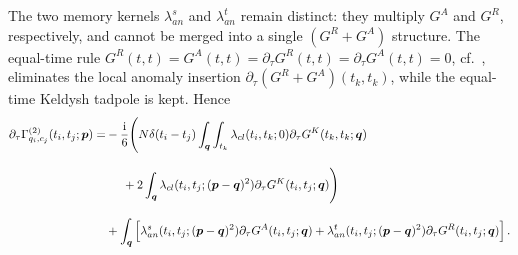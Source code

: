 \documentclass[reprint,english,superscriptaddress,preprintnumbers,amsmath,amssymb,aps,prd]{revtex4-1}
\begin{document}
The two memory kernels $\lambda_{an}^{s}$ and $\lambda_{an}^{t}$ remain distinct: they multiply $G^{A}$ and $G^{R}$, respectively, and cannot be merged into a single $(G^{R}+G^{A})$ structure. The equal-time rule $G^{R}(t,t)=G^{A}(t,t)=\partial_{\tau}G^{R}(t,t)=\partial_{\tau}G^{A}(t,t)=0$, cf.\ , eliminates the local anomaly insertion $\partial_{\tau}(G^{R}+G^{A})(t_k,t_k)$, while the equal-time Keldysh tadpole is kept. Hence
\begin{align}
    \partial_{\tau}\Gamma_{q_i,c_j}^{(2)}(t_i,t_j;\boldsymbol{p})=&-\frac{\mathrm{i}}{6}\Bigg(N\delta(t_i-t_j)\int_{\boldsymbol{q}}\int_{t_k}\lambda_{cl}(t_i,t_k;0)\partial_{\tau}G^{K}(t_k,t_k;\boldsymbol{q})\nonumber\\[2ex]
    &\hspace{0.5cm}+2\int_{\boldsymbol{q}}\lambda_{cl}(t_i,t_j;(\boldsymbol{p}-\boldsymbol{q})^2)\partial_{\tau}G^{K}(t_i,t_j;\boldsymbol{q})\Bigg)\nonumber\\[2ex]
    &+\int_{\boldsymbol{q}}\Big[\lambda_{an}^{s}(t_i,t_j;(\boldsymbol{p}-\boldsymbol{q})^2)\partial_{\tau}G^{A}(t_i,t_j;\boldsymbol{q})+\lambda_{an}^{t}(t_i,t_j;(\boldsymbol{p}-\boldsymbol{q})^2)\partial_{\tau}G^{R}(t_i,t_j;\boldsymbol{q})\Big]\,.\label{eq:qc-equaltime}
\end{align}
\end{document}
